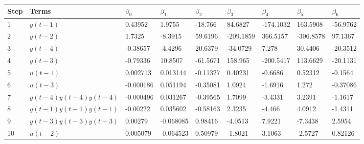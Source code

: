 \begin{tabular}{lllllllll}
Step & Terms & $\beta_{0}$ & $\beta_{1}$ & $\beta_{2}$ & $\beta_{3}$ & $\beta_{4}$ & $\beta_{5}$ & $\beta_{6}$ \\ 
\hline 
1 & $y(t-1)$ & 0.43952 & 1.9755 & -18.766 & 84.6827 & -174.1032 & 163.5908 & -56.9762 \\ 
2 & $y(t-2)$ & 1.7325 & -8.3915 & 59.6196 & -209.1859 & 366.5157 & -306.8578 & 97.1367 \\ 
3 & $y(t-4)$ & -0.38657 & -4.4296 & 20.6379 & -34.0729 & 7.278 & 30.4406 & -20.3512 \\ 
4 & $y(t-3)$ & -0.79336 & 10.8507 & -61.5671 & 158.965 & -200.5417 & 113.6629 & -20.1131 \\ 
5 & $u(t-1)$ & 0.002713 & 0.013144 & -0.11327 & 0.40231 & -0.6686 & 0.52312 & -0.1564 \\ 
6 & $u(t-3)$ & -0.000186 & 0.051194 & -0.35081 & 1.0924 & -1.6916 & 1.272 & -0.37086 \\ 
7 & $y(t-4)y(t-4)y(t-4)$ & -0.000496 & 0.031267 & -0.39565 & 1.7099 & -3.4331 & 3.2391 & -1.1617 \\ 
8 & $y(t-1)y(t-1)y(t-1)$ & -0.00222 & 0.035602 & -0.58163 & 2.3235 & -4.466 & 4.0912 & -1.4311 \\ 
9 & $y(t-3)y(t-3)y(t-3)$ & 0.00279 & -0.068085 & 0.98416 & -4.0513 & 7.9221 & -7.3438 & 2.5954 \\ 
10 & $u(t-2)$ & 0.005079 & -0.064523 & 0.50979 & -1.8021 & 3.1063 & -2.5727 & 0.82126 \\ 
\hline 
\end{tabular}